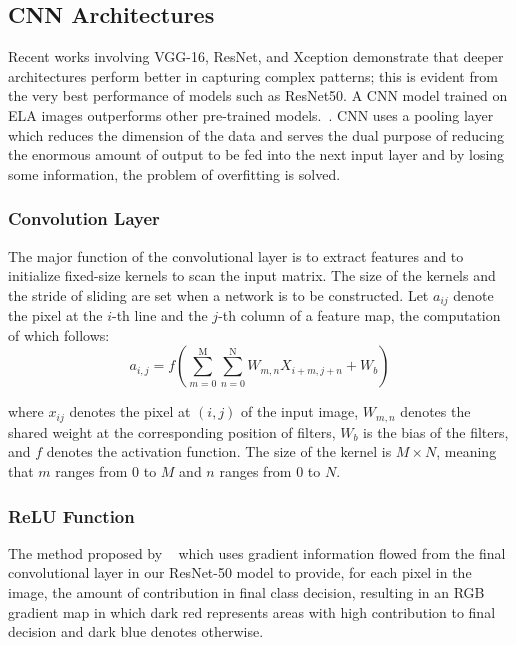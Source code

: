 \documentclass{ieeeaccess}
\begin{document}
\subsection{CNN Architectures} 

Recent works involving VGG-16, ResNet, and Xception demonstrate that deeper architectures perform better in capturing complex patterns; this is evident from the very best performance of models such as ResNet50. A CNN model trained on ELA images outperforms other pre-trained models.~\cite{9885600}. CNN uses a pooling layer which reduces the dimension of the data and serves the dual purpose of reducing the enormous amount of output to be fed into the next input layer and by losing some information, the problem of overfitting is solved.~\cite{9121083}

\subsubsection{Convolution Layer}
The major function of the convolutional layer is to extract features and to initialize fixed-size kernels to scan the input matrix. The size of the kernels and the stride of sliding are set when a network is to be constructed.
Let \( a_{ij} \) denote the pixel at the \( i \)-th line and the \( j \)-th column of a feature map, the computation of which follows:
\begin{equation*} a_{i,j}=f(\sum_{m=0}^{\mathrm{M}}\sum_{n=0}^{\mathrm{N}}W_{m,n}X_{i+m,j+n}+W_{b}) \tag{1} \end{equation*}

where \( x_{ij} \) denotes the pixel at \((i, j)\) of the input image, \( W_{m,n} \) denotes the shared weight at the corresponding position of filters, \( W_{b} \) is the bias of the filters, and \( f \) denotes the activation function. The size of the kernel is \( M \times N \), meaning that \( m \) ranges from \( 0 \) to \( M \) and \( n \) ranges from \( 0 \) to \( N \).~\cite{8456123}


\subsubsection{ReLU Function}
The method proposed by ~\cite{selvaraju2016grad} which uses gradient information flowed from the final convolutional layer in our ResNet-50 model to provide, for each pixel in the image, the amount of contribution in final class decision, resulting in an RGB gradient map in which dark red represents areas with high contribution to final decision and dark blue denotes otherwise.
\end{document}
